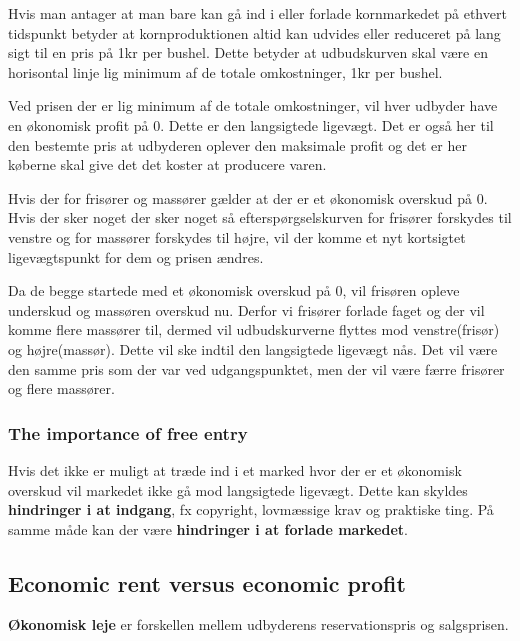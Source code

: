 Hvis man antager at man bare kan gå ind i eller forlade kornmarkedet på ethvert tidspunkt betyder at kornproduktionen altid kan udvides eller reduceret på lang sigt til en pris på 1kr per bushel. Dette betyder at udbudskurven skal være en horisontal linje lig minimum af de totale omkostninger, 1kr per bushel. 

Ved prisen der er lig minimum af de totale omkostninger, vil hver udbyder have en økonomisk profit på 0. Dette er den langsigtede ligevægt. Det er også her til den bestemte pris at udbyderen oplever den maksimale profit og det er her køberne skal give det det koster at producere varen. 

\begin{eks} \textbf{} %
\newline
Hvis der for frisører og massører gælder at der er et økonomisk overskud på 0. Hvis der sker noget der sker noget så efterspørgselskurven for frisører forskydes til venstre og for massører forskydes til højre, vil der komme et nyt kortsigtet ligevægtspunkt for dem og prisen ændres. 

Da de begge startede med et økonomisk overskud på 0, vil frisøren opleve underskud og massøren overskud nu. Derfor vi frisører forlade faget og der vil komme flere massører til, dermed vil udbudskurverne flyttes mod venstre(frisør) og højre(massør). Dette vil ske indtil den langsigtede ligevægt nås. Det vil være den samme pris som der var ved udgangspunktet, men der vil være færre frisører og flere massører. 
\end{eks}

\subsubsection{The importance of free entry}
Hvis det ikke er muligt at træde ind i et marked hvor der er et økonomisk overskud vil markedet ikke gå mod langsigtede ligevægt. Dette kan skyldes \textbf{hindringer i at indgang}, fx copyright, lovmæssige krav og praktiske ting. På samme måde kan der være \textbf{hindringer i at forlade markedet}.

\subsection{Economic rent versus economic profit}
\textbf{Økonomisk leje} er forskellen mellem udbyderens reservationspris og salgsprisen. 

